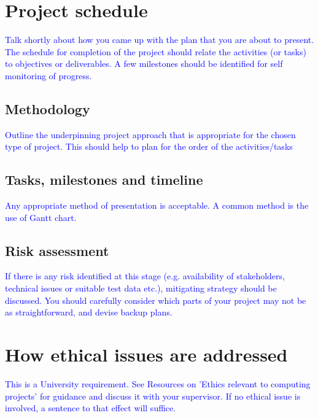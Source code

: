 \documentclass[acmtog, nonacm]{acmart}
\begin{document}
\section{Project schedule}
\textcolor{blue}{Talk shortly about how you came up with the plan that you are about to present. 
The schedule for completion of the project should relate the activities (or tasks)  to objectives or deliverables. A few milestones should be identified for self monitoring of progress.}

\subsection{Methodology}
\textcolor{blue}{Outline the underpinning project approach that is appropriate for the chosen type of project. This should help to plan for the order of the activities/tasks}


\subsection{Tasks, milestones and timeline}
\textcolor{blue}{Any appropriate method of presentation is acceptable. A common method is the use of Gantt chart.}

\subsection{Risk assessment}
\textcolor{blue}{If there is any risk identified at this stage (e.g. availability of stakeholders, technical issues or suitable test data etc.), mitigating strategy should be discussed.
You should carefully consider which parts of your project may not be as straightforward, and devise backup plans. }




\appendix

\section{How ethical issues are addressed}
\textcolor{blue}{This is a University requirement. See Resources on 'Ethics relevant to computing projects' for guidance and discuss it with your supervisor. If no ethical issue is involved, a sentence to that effect will suffice.}
\end{document}
